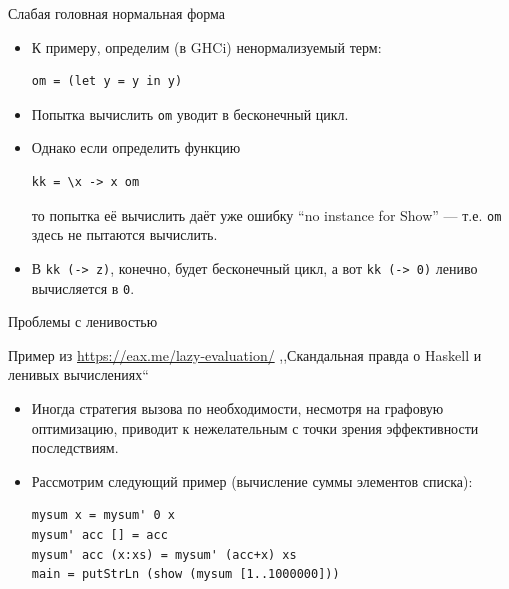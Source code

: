 \documentclass[xcolor=dvipsnames]{beamer}
\begin{document}
\begin{frame}[fragile]{Слабая головная нормальная форма}

\begin{itemize}[<+->]
 \item К примеру, определим (в GHCi) ненормализуемый терм:
 \begin{verbatim}
om = (let y = y in y)
 \end{verbatim}
 \item Попытка вычислить \texttt{om} уводит в бесконечный цикл.
 \item Однако если определить функцию
\begin{verbatim}
kk = \x -> x om
\end{verbatim}
то попытка её вычислить даёт уже ошибку ``no instance for Show'' --- т.е. \texttt{om} здесь не пытаются вычислить.
\item В \texttt{kk (\z -> z)}, конечно, будет бесконечный цикл, а вот \texttt{kk (\z -> 0)} лениво вычисляется в \texttt{0}.
\end{itemize}


\end{frame}

\begin{frame}[fragile]{Проблемы с ленивостью}

{\footnotesize Пример из \url{https://eax.me/lazy-evaluation/} ,,Скандальная правда о Haskell и ленивых вычислениях``

}

\begin{itemize}[<+->]
 \item Иногда стратегия вызова по необходимости, несмотря на графовую оптимизацию, приводит к нежелательным с точки зрения эффективности последствиям.
 \item Рассмотрим следующий пример (вычисление суммы элементов списка):
 \begin{verbatim}
mysum x = mysum' 0 x
mysum' acc [] = acc
mysum' acc (x:xs) = mysum' (acc+x) xs
main = putStrLn (show (mysum [1..1000000]))
 \end{verbatim}

\end{itemize}

 
\end{frame}
\end{document}
